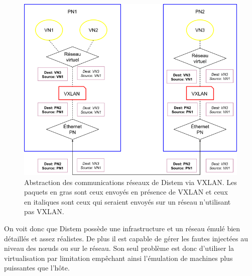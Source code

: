 \begin{figure}
  \centering
  \includegraphics[scale=0.45]{Pictures/png/Distem_VXLAN}
  \caption[Abstraction des communications réseaux de Distem via VXLAN]{Abstraction des communications réseaux de Distem via VXLAN. Les paquets en gras sont ceux envoyés en présence de VXLAN et ceux en italiques sont ceux qui seraient envoyés sur un réseau n'utilisant pas VXLAN.}
  \label{Distem_VXLAN}
\end{figure}

On voit donc que Distem possède une infrastructure et un réseau émulé bien
détaillés et assez réalistes. De plus il est capable de gérer les fautes
injectées au niveau des n\oe uds ou sur le réseau. Son seul problème est donc
d'utiliser la virtualisation par limitation empêchant ainsi l'émulation de
machines plus puissantes que l'hôte.
